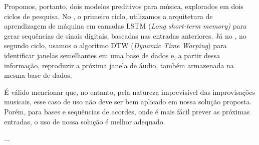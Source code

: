 Propomos, portanto, dois modelos preditivos para música, explorados em dois ciclos de pesquisa. No , o primeiro ciclo, utilizamos a arquitetura de aprendizagem de máquina em camadas LSTM (\textit{Long short-term memory)} \cite{lstm} para gerar sequências de sinais digitais, baseadas nas entradas anteriores. Já no , no segundo ciclo, usamos o algoritmo DTW (\textit{Dynamic Time Warping}) \cite{dtw} para identificar janelas semelhantes em uma base de dados e, a partir dessa informação, reproduzir a próxima janela de áudio, também armazenada na mesma base de dados.

É válido mencionar que, no entanto, pela natureza imprevisível das improvisações musicais, esse caso de uso não deve ser bem aplicado em nossa solução proposta. Porém, para bases e sequências de acordes, onde é mais fácil prever as próximas entradas, o uso de nossa solução é melhor adequado.

...
